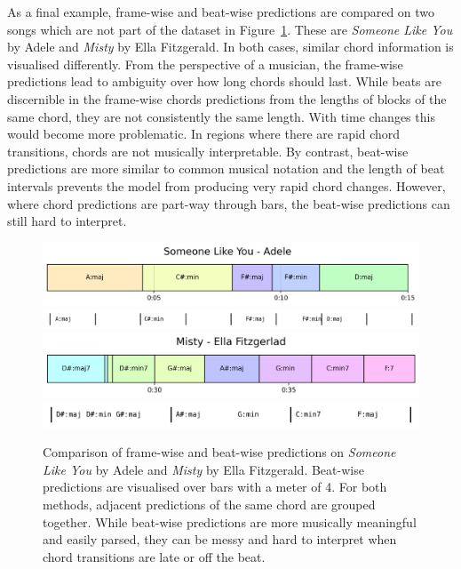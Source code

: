 As a final example, frame-wise and beat-wise predictions are compared on two songs which are not part of the dataset in Figure~\ref{fig:frame_vs_beat_wise}. These are \emph{Someone Like You} by Adele and \emph{Misty} by Ella Fitzgerald. In both cases, similar chord information is visualised differently. From the perspective of a musician, the frame-wise predictions lead to ambiguity over how long chords should last. While beats are discernible in the frame-wise chords predictions from the lengths of blocks of the same chord, they are not consistently the same length. With time changes this would become more problematic. In regions where there are rapid chord transitions, chords are not musically interpretable. By contrast, beat-wise predictions are more similar to common musical notation and the length of beat intervals prevents the model from producing very rapid chord changes. However, where chord predictions are part-way through bars, the beat-wise predictions can still hard to interpret.

\begin{figure}[H]
    \centering
    \includegraphics[width=1.0\textwidth]{figures/someone_like_you_chord_blocks.png}
    \includegraphics[width=1.0\textwidth]{figures/someone_like_you_chord_chart.png}\\
    \vspace{0.5cm}
    \includegraphics[width=1.0\textwidth]{figures/misty_chord_plot.png}
    \includegraphics[width=1.0\textwidth]{figures/misty_chord_chart.png}
    \caption{Comparison of frame-wise and beat-wise predictions on \emph{Someone Like You} by Adele and \emph{Misty} by Ella Fitzgerald. Beat-wise predictions are visualised over bars with a meter of 4. For both methods, adjacent predictions of the same chord are grouped together. While beat-wise predictions are more musically meaningful and easily parsed, they can be messy and hard to interpret when chord transitions are late or off the beat.}\label{fig:frame_vs_beat_wise}
\end{figure}